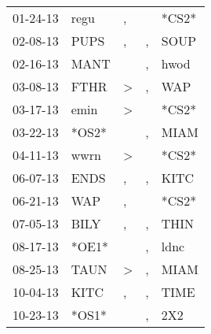 \begin{supertabular}{p{0.07\textwidth}p{0.06\textwidth}p{0.02\textwidth}p{0.02\textwidth}p{0.06\textwidth}}
          01-24-13\textsuperscript{} &           regu\textsuperscript{} &                , &                  &                            *CS2* \\
          02-08-13\textsuperscript{} &           PUPS\textsuperscript{} &                , &                , &           SOUP\textsuperscript{} \\
          02-16-13\textsuperscript{} &           MANT\textsuperscript{} &                  &                , &           hwod\textsuperscript{} \\
          03-08-13\textsuperscript{} &           FTHR\textsuperscript{} &     \textgreater &                , &            WAP\textsuperscript{} \\
          03-17-13\textsuperscript{} &           emin\textsuperscript{} &     \textgreater &                  &                            *CS2* \\
          03-22-13\textsuperscript{} &                            *OS2* &                  &                , &           MIAM\textsuperscript{} \\
          04-11-13\textsuperscript{} &           wwrn\textsuperscript{} &     \textgreater &                  &                            *CS2* \\
          06-07-13\textsuperscript{} &           ENDS\textsuperscript{} &                , &                , &           KITC\textsuperscript{} \\
          06-21-13\textsuperscript{} &            WAP\textsuperscript{} &                , &                  &                            *CS2* \\
          07-05-13\textsuperscript{} &           BILY\textsuperscript{} &                , &                , &           THIN\textsuperscript{} \\
          08-17-13\textsuperscript{} &                            *OE1* &                  &                , &           ldnc\textsuperscript{} \\
          08-25-13\textsuperscript{} &           TAUN\textsuperscript{} &     \textgreater &                , &           MIAM\textsuperscript{} \\
          10-04-13\textsuperscript{} &           KITC\textsuperscript{} &                , &                , &           TIME\textsuperscript{} \\
          10-23-13\textsuperscript{} &                            *OS1* &                  &                , &            2X2\textsuperscript{} \\

\end{supertabular}
